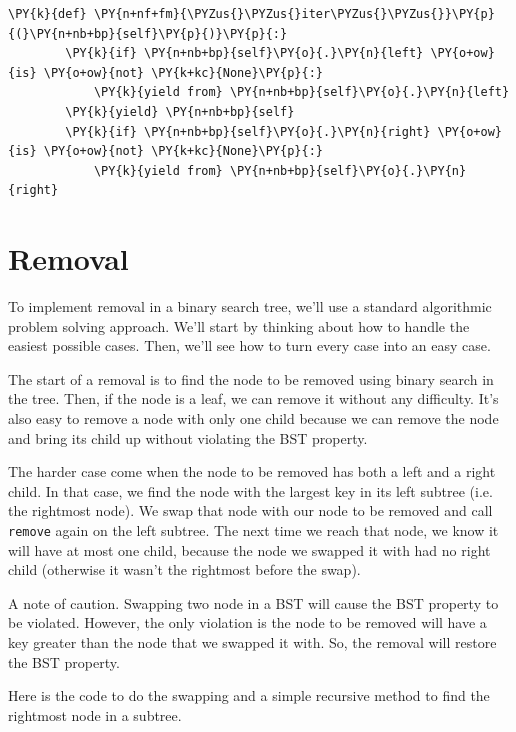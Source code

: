 \begin{Verbatim}[commandchars=\\\{\}]
    \PY{k}{def} \PY{n+nf+fm}{\PYZus{}\PYZus{}iter\PYZus{}\PYZus{}}\PY{p}{(}\PY{n+nb+bp}{self}\PY{p}{)}\PY{p}{:}
        \PY{k}{if} \PY{n+nb+bp}{self}\PY{o}{.}\PY{n}{left} \PY{o+ow}{is} \PY{o+ow}{not} \PY{k+kc}{None}\PY{p}{:}
            \PY{k}{yield from} \PY{n+nb+bp}{self}\PY{o}{.}\PY{n}{left}
        \PY{k}{yield} \PY{n+nb+bp}{self}
        \PY{k}{if} \PY{n+nb+bp}{self}\PY{o}{.}\PY{n}{right} \PY{o+ow}{is} \PY{o+ow}{not} \PY{k+kc}{None}\PY{p}{:}
            \PY{k}{yield from} \PY{n+nb+bp}{self}\PY{o}{.}\PY{n}{right}
\end{Verbatim}


\section{Removal}


To implement removal in a binary search tree, we'll use a standard algorithmic problem solving approach.
We'll start by thinking about how to handle the easiest possible cases.
Then, we'll see how to turn every case into an easy case.


The start of a removal is to find the node to be removed using binary search in the tree.
Then, if the node is a leaf, we can remove it without any difficulty.
It's also easy to remove a node with only one child because we can remove the node and bring its child up without violating the BST property.


The harder case come when the node to be removed has both a left and a right child.
In that case, we find the node with the largest key in its left subtree (i.e. the rightmost node).
We swap that node with our node to be removed and call \texttt{remove} again on the left subtree.
The next time we reach that node, we know it will have at most one child, because the node we swapped it with had no right child (otherwise it wasn't the rightmost before the swap).


A note of caution.
Swapping two node in a BST will cause the BST property to be violated.
However, the only violation is the node to be removed will have a key greater than the node that we swapped it with.
So, the removal will restore the BST property.


Here is the code to do the swapping and a simple recursive method to find the rightmost node in a subtree.

